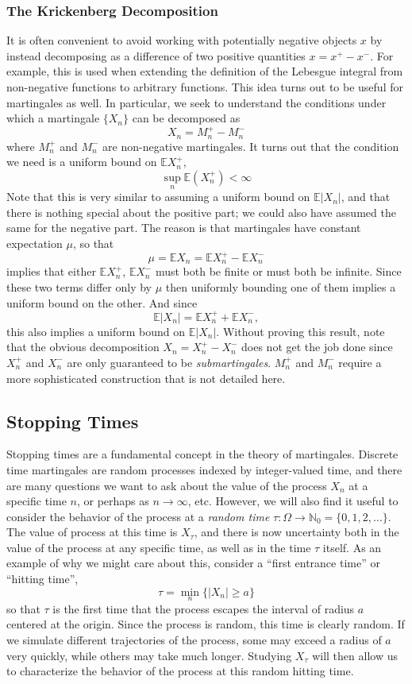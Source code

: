 \documentclass[12pt]{article}
\newcommand*{\abs}[1]{\left\lvert#1\right\rvert}
\newcommand{\E}{\mathbb{E}}
\begin{document}
\subsubsection{The Krickenberg Decomposition}
It is often convenient to avoid working with potentially negative objects $x$ by instead decomposing as a difference of two positive quantities $x = x^+ - x^-$. For example, this is used 
when extending the definition of the Lebesgue integral from non-negative functions to arbitrary functions. This idea turns out to be useful for martingales as well. In particular, we seek 
to understand the conditions under which a martingale $\{X_n\}$ can be decomposed as 
\[X_n = M_n^+ - M_n^-\]
where $M_n^+$ and $M_n^-$ are non-negative martingales. It turns out that the condition we need is a uniform bound on $\E X_n^+$, 
\[\sup_n \E(X_n^+) < \infty\]
Note that this is very similar to assuming a uniform bound on $\E \abs{X_n}$, and that there is nothing special about the positive part; we could also have assumed the same for the negative 
part. The reason is that martingales have constant expectation $\mu$, so that 
\[\mu = \E X_n = \E X_n^+ - \E X_n^-\]
implies that either $\E X_n^+$,  $\E X_n^-$ must both be finite or must both be infinite. Since these two terms differ only by $\mu$ then uniformly bounding one of them implies a uniform bound 
on the other. And since 
\[\E\abs{X_n} =  \E X_n^+ + \E X_n^-,\]
this also implies a uniform bound on $\E\abs{X_n}$. Without proving this result, note that the obvious decomposition $X_n = X_n^+ - X_n^-$ does not get the job done since 
$X_n^+$ and $X_n^-$ are only guaranteed to be \textit{submartingales}. $M_n^+$ and $M_n^-$ require a more sophisticated construction that is not detailed here. 

\subsection{Stopping Times}
Stopping times are a fundamental concept in the theory of martingales. Discrete time martingales are random processes indexed by integer-valued time, and there are many questions we want 
to ask about the value of the process $X_n$ at a specific time $n$, or perhaps as $n \to \infty$, etc. However, we will also find it useful to consider the behavior of the process at a \textit{random time}
$\tau: \Omega \to \mathbb{N}_0 = \{0, 1, 2, \dots\}$. The value of process at this time is $X_\tau$, and there is now uncertainty both in the value of the process at any specific time, as well as 
in the time $\tau$ itself. As an example of why we might care about this, consider a ``first entrance time'' or ``hitting time'',
\[\tau = \min_{n} \{\abs{X_n} \geq a\}\]
so that $\tau$ is the first time that the process escapes the interval of radius $a$ centered at the origin. Since the process is random, this time is clearly random. If we simulate different trajectories 
of the process, some may exceed a radius of $a$ very quickly, while others may take much longer. Studying $X_\tau$ will then allow us to characterize the behavior of the process at this random 
hitting time.
\end{document}
